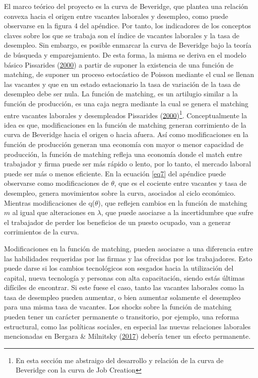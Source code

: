 \documentclass[12pt,twoside]{reedthesis}
\begin{document}
El marco teórico del proyecto es la curva de Beveridge, que plantea una relación convexa hacia el origen entre vacantes laborales y desempleo, como puede observarse en la figura 4 del apéndice. Por tanto, los indicadores de los conceptos claves sobre los que se trabaja son el índice de vacantes laborales y la tasa de desempleo. Sin embargo, es posible enmarcar la curva de Beveridge bajo la teoría de búsqueda y emparejamiento. De esta forma, la misma se deriva en el modelo básico Pissarides (\protect\hyperlink{ref-Pissarides2000}{2000}) a partir de suponer la existencia de una función de matching, de suponer un proceso estocástico de Poisson mediante el cual se llenan las vacantes y que en un estado estacionario la tasa de variación de la tasa de desempleo debe ser nula. La función de matching, es un artilugio similar a la función de producción, es una caja negra mediante la cual se genera el matching entre vacantes laborales y desempleados Pissarides (\protect\hyperlink{ref-Pissarides2000}{2000})\footnote{En esta sección me abstraigo del desarrollo y relación de la curva de Beveridge con la curva de Job Creation}. Conceptualmente la idea es que, modificaciones en la función de matching generan corrimiento de la curva de Beveridge hacia el origen o hacia afuera. Así como modificaciones en la función de producción generan una economía con mayor o menor capacidad de producción, la función de matching refleja una economía donde el match entre trabajador y firma puede ser más rápido o lento, por lo tanto, el mercado laboral puede ser más o menos eficiente. En la ecuación \eqref{eq7} del apéndice puede observarse como modificaciones de \(\theta\), que es el cociente entre vacantes y tasa de desempleo, genera movimientos sobre la curva, asociados al ciclo económico. Mientras modificaciones de q(\(\theta\)), que reflejen cambios en la función de matching \(m\) al igual que alteraciones en \(\lambda\), que puede asociarse a la incertidumbre que sufre el trabajador de perder los beneficios de un puesto ocupado, van a generar corrimientos de la curva.

Modificaciones en la función de matching, pueden asociarse a una diferencia entre las habilidades requeridas por las firmas y las ofrecidas por los trabajadores. Esto puede darse si los cambios tecnológicos son sesgados hacia la utilización del capital, nueva tecnología y personas con alta capacitación, siendo estás últimas difíciles de encontrar. Si este fuese el caso, tanto las vacantes laborales como la tasa de desempleo pueden aumentar, o bien aumentar solamente el desempleo para una misma tasa de vacantes. Los shocks sobre la función de matching pueden tener un carácter permanente o transitorio, por ejemplo, una reforma estructural, como las políticas sociales, en especial las nuevas relaciones laborales mencionadas en Bergara \& Milnitsky (\protect\hyperlink{ref-Bergara2017}{2017}) debería tener un efecto permanente.
\end{document}
